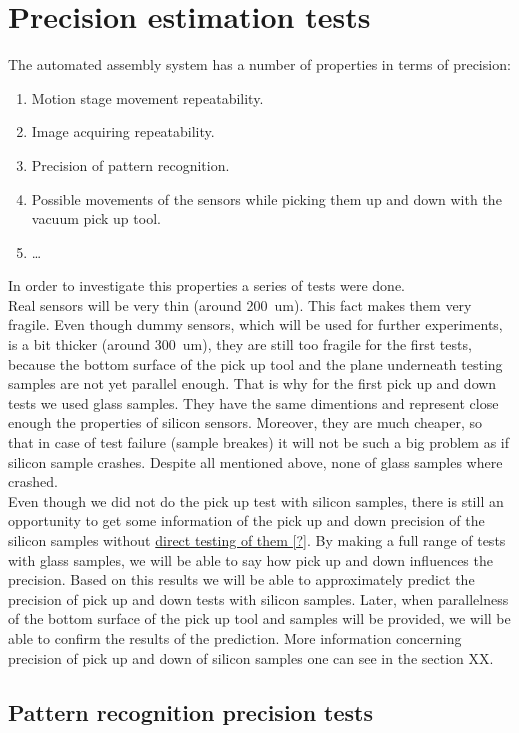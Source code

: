 \chapter{Precision estimation tests}
The automated assembly system has a number of properties in terms of precision:
\begin{enumerate}
\item Motion stage movement repeatability.
\item Image acquiring repeatability.
\item Precision of pattern recognition.
\item Possible movements of the sensors while picking them up and down with the vacuum pick up tool.
\item \ldots
\end{enumerate}
In order to investigate this properties a series of tests were done.
\\Real sensors will be very thin (around 200~um). This fact makes them very fragile. Even though dummy sensors, which will be used for further experiments, is a bit thicker (around 300~um), they are still too fragile for the first tests, because the bottom surface of the pick up tool and the plane underneath testing samples are not yet parallel enough. That is why for the first pick up and down tests we used glass samples. They have the same dimentions and represent close enough the properties of silicon sensors. Moreover, they are much cheaper, so that in case of test failure (sample breakes) it will not be such a big problem as if silicon sample crashes. Despite all mentioned above, none of glass samples where crashed.
\\Even though we did not do the pick up test with silicon samples, there is still an opportunity to get some information of the pick up and down precision of the silicon samples without \underline{direct testing of them [?]}. By making a full range of tests with glass samples, we will be able to say how pick up and down influences the precision. Based on this results we will be able to approximately predict the precision of pick up and down tests with silicon samples. Later, when parallelness of the bottom surface of the pick up tool and samples will be provided, we will be able to confirm the results of the prediction. More information concerning precision of pick up and down of silicon samples one can see in the section XX.

\section{Pattern recognition precision tests}

